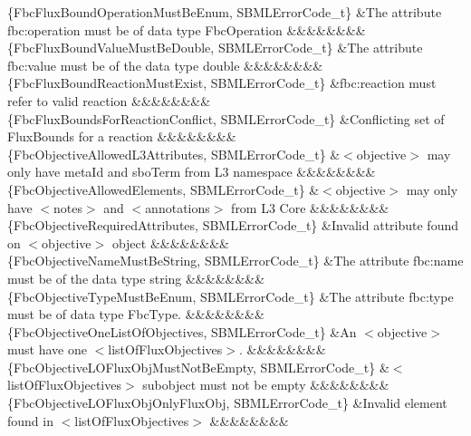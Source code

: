 \begin{DoxyParagraph}{}
\begin{longtabu}
\{Fbc\+Flux\+Bound\+Operation\+Must\+Be\+Enum, S\+B\+M\+L\+Error\+Code\+\_\+t\} &The attribute \textquotesingle{}fbc\+:operation\textquotesingle{} must be of data type Fbc\+Operation &&&&&&&&\\
\{Fbc\+Flux\+Bound\+Value\+Must\+Be\+Double, S\+B\+M\+L\+Error\+Code\+\_\+t\} &The attribute \textquotesingle{}fbc\+:value\textquotesingle{} must be of the data type double &&&&&&&&\\
\{Fbc\+Flux\+Bound\+Reaction\+Must\+Exist, S\+B\+M\+L\+Error\+Code\+\_\+t\} &\textquotesingle{}fbc\+:reaction\textquotesingle{} must refer to valid reaction &&&&&&&&\\
\{Fbc\+Flux\+Bounds\+For\+Reaction\+Conflict, S\+B\+M\+L\+Error\+Code\+\_\+t\} &Conflicting set of Flux\+Bounds for a reaction &&&&&&&&\\
\{Fbc\+Objective\+Allowed\+L3\+Attributes, S\+B\+M\+L\+Error\+Code\+\_\+t\} &{\ttfamily $<$objective$>$} may only have \textquotesingle{}meta\+Id\textquotesingle{} and \textquotesingle{}sbo\+Term\textquotesingle{} from L3 namespace &&&&&&&&\\
\{Fbc\+Objective\+Allowed\+Elements, S\+B\+M\+L\+Error\+Code\+\_\+t\} &{\ttfamily $<$objective$>$} may only have {\ttfamily $<$notes$>$} and {\ttfamily $<$annotations$>$} from L3 Core &&&&&&&&\\
\{Fbc\+Objective\+Required\+Attributes, S\+B\+M\+L\+Error\+Code\+\_\+t\} &Invalid attribute found on {\ttfamily $<$objective$>$} object &&&&&&&&\\
\{Fbc\+Objective\+Name\+Must\+Be\+String, S\+B\+M\+L\+Error\+Code\+\_\+t\} &The attribute \textquotesingle{}fbc\+:name\textquotesingle{} must be of the data type string &&&&&&&&\\
\{Fbc\+Objective\+Type\+Must\+Be\+Enum, S\+B\+M\+L\+Error\+Code\+\_\+t\} &The attribute \textquotesingle{}fbc\+:type\textquotesingle{} must be of data type Fbc\+Type. &&&&&&&&\\
\{Fbc\+Objective\+One\+List\+Of\+Objectives, S\+B\+M\+L\+Error\+Code\+\_\+t\} &An {\ttfamily $<$objective$>$} must have one {\ttfamily $<$list\+Of\+Flux\+Objectives$>$}. &&&&&&&&\\
\{Fbc\+Objective\+L\+O\+Flux\+Obj\+Must\+Not\+Be\+Empty, S\+B\+M\+L\+Error\+Code\+\_\+t\} &{\ttfamily $<$list\+Of\+Flux\+Objectives$>$} subobject must not be empty &&&&&&&&\\
\{Fbc\+Objective\+L\+O\+Flux\+Obj\+Only\+Flux\+Obj, S\+B\+M\+L\+Error\+Code\+\_\+t\} &Invalid element found in {\ttfamily $<$list\+Of\+Flux\+Objectives$>$} &&&&&&&&\\

\end{longtabu}
\end{DoxyParagraph}
